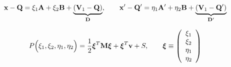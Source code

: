 $$ \mathbf{x}-\mathbf{Q}
   =
   \xi_1 \mathbf{A} + \xi_2 \mathbf{B} + 
   \underbrace{(\mathbf{V}_1-\mathbf{Q})}_{\mathbf{D}}, 
   \qquad
   \mathbf{x}^\prime-\mathbf{Q}^\prime
   =
   \eta_1 \mathbf{A}^\prime + \eta_2 \mathbf{B} + 
   \underbrace{(\mathbf{V}_1-\mathbf{Q}^\prime)}_{\mathbf{D}^\prime}
$$

$$ P\Big(\xi_1, \xi_2, \eta_1, \eta_2\Big)
   = \frac{1}{2}\boldsymbol{\xi}^T \mathbf{M} \boldsymbol{\xi}
     +\boldsymbol{\xi}^T \mathbf{v}
     +S, 
   \qquad
 \boldsymbol{\xi}
\equiv
 \left(\begin{array}{c}
 \xi_1 \\ \xi_2 \\ \eta_1 \\ \eta_2
 \end{array}\right)
$$


